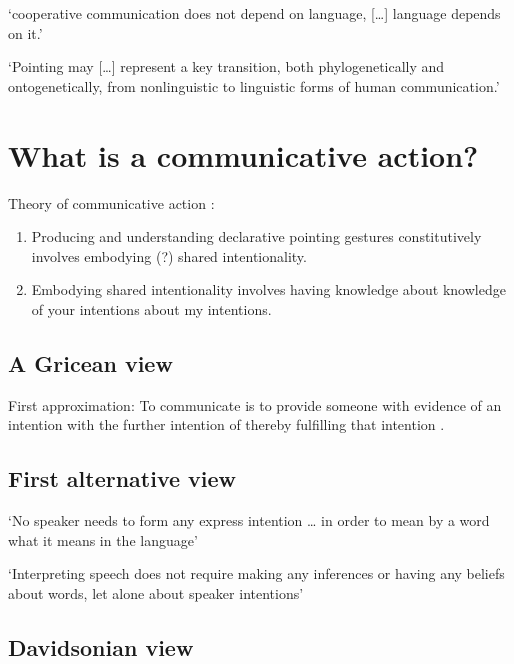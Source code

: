 \documentclass[12pt]{extarticle}
\begin{document}
\begin{multicols}{3}
‘cooperative communication does not depend on language, […] language depends on it.’ \citep[p.\ 720]{Tomasello:2007fi}
 
‘Pointing may […] represent a key transition, both phylogenetically and ontogenetically, from nonlinguistic to linguistic forms of human communication.’ \citep[p.\ 720]{Tomasello:2007fi}
 
 
 
\section{What is a communicative action?}
 
Theory of communicative action \citep[compare][]{Tomasello:2007fi}:
 
\begin{enumerate}
 
\item
 
Producing and understanding declarative pointing gestures constitutively involves embodying (?) shared intentionality.
 
\item
 
Embodying shared intentionality involves having knowledge about knowledge of your intentions about my intentions.
 
\end{enumerate}
 
\subsection{A Gricean view}
 
First approximation: To communicate is to provide someone with evidence of an intention with the further intention of thereby fulfilling that intention
\citep[compare][chapter 14]{Grice:1989ha}.
 
\subsection{First alternative view}
 
‘No speaker needs to form any express intention … in order to mean by a word what it means in the language’
\citep[p.\ 473]{Dummett:1986mq}
 
‘Interpreting speech does not require making any inferences or having any beliefs about words, let alone about speaker intentions’
\citep[p.\ 62]{Millikan:1984ib}
 
\subsection{Davidsonian view}
 

\end{multicols}
\end{document}
